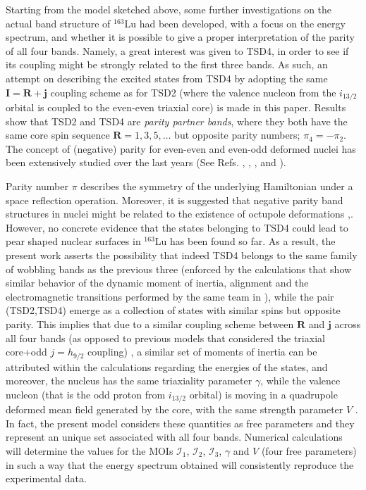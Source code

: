 \documentclass[%
 reprint,
 amsmath,
 amssymb,
 aps,
 floatfix,
]{revtex4-2}
\begin{document}
Starting from the model sketched above, some further investigations on the actual band structure of $^{163}$Lu had been developed, with a focus on the energy spectrum, and whether it is possible to give a proper interpretation of the parity of all four bands. Namely, a great interest was given to TSD4, in order to see if its coupling might be strongly related to the first three bands. As such, an attempt on describing the excited states from TSD4 by adopting the same $\mathbf{I}=\mathbf{R}+\mathbf{j}$ coupling scheme as for TSD2 (where the valence nucleon from the $i_{13/2}$ orbital is coupled to the even-even triaxial core) is made in this paper. Results show that TSD2 and TSD4 are \emph{parity partner bands}, where they both have the same core spin sequence $\mathbf{R}=1,3,5,\dots$ but opposite parity numbers; $\pi_4=-\pi_2$. The concept of (negative) parity for even-even and even-odd deformed nuclei has been extensively studied over the last years (See Refs. \cite{raduta2006description}, \cite{raduta2006positive}, \cite{raduta2006simultaneous}, and \cite{bizzeti2008description}). 

Parity number $\pi$ describes the symmetry of the underlying Hamiltonian under a space reflection operation. Moreover, it is suggested that negative parity band structures in nuclei might be related to the existence of octupole deformations \cite{chasman1980incipient},\cite{asaro1953complex}. However, no concrete evidence that the states belonging to TSD4 could lead to pear shaped nuclear surfaces in $^{163}$Lu has been found so far. As a result, the present work asserts the possibility that indeed TSD4 belongs to the same family of wobbling bands as the previous three (enforced by the calculations that show similar behavior of the dynamic moment of inertia, alignment and the electromagnetic transitions performed by the same team in \cite{raduta2020towards}), while the pair (TSD2,TSD4) emerge as a collection of states with similar spins but opposite parity. This implies that due to a similar coupling scheme between $\mathbf{R}$ and $\mathbf{j}$ across all four bands (as opposed to previous models that considered the triaxial core+odd $j=h_{9/2}$ coupling) , a similar set of moments of inertia can be attributed within the calculations regarding the energies of the states, and moreover, the nucleus has the same triaxiality parameter $\gamma$, while the valence nucleon (that is the odd proton from $i_{13/2}$ orbital) is moving in a quadrupole deformed mean field generated by the core, with the same strength parameter $V$ \cite{shou2009coupling}. In fact, the present model considers these quantities as free parameters and they represent an unique set associated with all four bands. Numerical calculations will determine the values for the MOIs $\mathcal{I}_1$, $\mathcal{I}_2$, $\mathcal{I}_3$, $\gamma$ and $V$ (four free parameters) in such a way that the energy spectrum obtained will consistently reproduce the experimental data.
\end{document}
